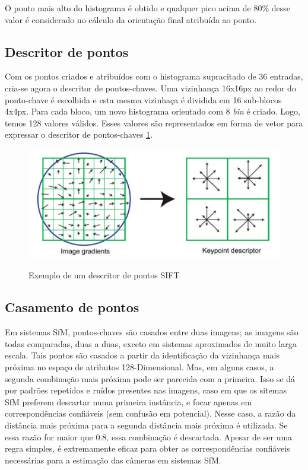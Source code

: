 O ponto mais alto do histograma é obtido e qualquer pico acima de 80\% desse
valor é considerado no cálculo da orientação final atribuída ao ponto. 

\subsection{Descritor de pontos}

Com os pontos criados e atribuídos com o histograma 
supracitado de 36 entradas, cria-se agora o descritor de pontos-chaves.
Uma vizinhança 16x16px ao redor do ponto-chave é escolhida e esta mesma vizinhaça
é dividida em 16 sub-blocos 4x4px. Para cada bloco, um novo histograma orientado com 8
\emph{bin} é criado. Logo, temos 128 valores válidos. Esses valores são
representados em forma de vetor para expressar o descritor de pontos-chaves
\ref{fig:descritorkeypoint}.  

\begin{figure} [!h]
	\centering
	\caption{Exemplo de um descritor de pontos SIFT}
	\includegraphics[width=0.45\linewidth]{figs/descritorKeypoint.png}
	\label{fig:descritorkeypoint}
\end{figure}

\subsection{Casamento de pontos}

Em sistemas SfM, pontos-chaves são casados entre duas imagens; as imagens são
todas comparadas, duas a duas, exceto em sistemas aproximados de muito larga escala.
Tais pontos são casados a partir da identificação da
vizinhança mais próxima no espaço de atributos 128-Dimensional. Mas, em alguns
casos, a segunda combinação mais próxima pode ser parecida com a primeira. Isso
se dá por padrões repetidos e ruídos presentes nas imagens, caso em que os
sitemas SfM preferem descartar numa primeira instância, e focar apenas em
correspondências confiáveis (sem confusão em potencial).  Nesse caso, a razão da distância
mais próxima para a segunda distância mais próxima é utilizada. Se essa razão
for maior que 0.8, essa combinação é descartada. Apesar de ser uma regra
simples, é extremamente eficaz para obter as correspondências confiáveis
necessárias para a estimação das câmeras em sistemas SfM.

